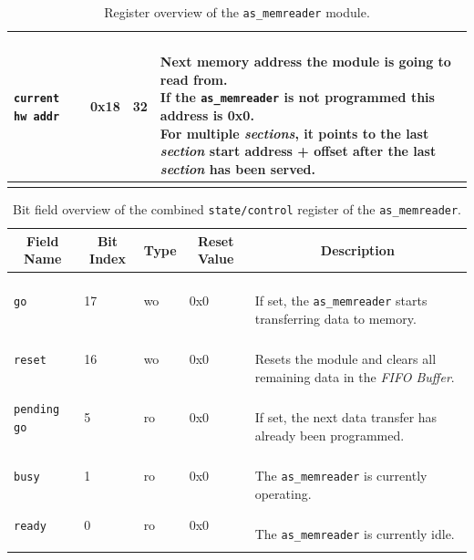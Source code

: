 \begin{longtable}[ht]{|l|l|l|l|}
    \texttt{current hw addr} & 0x18 & 32 & \parbox{7cm}{\ \\
        Next memory address the module is going to read from.\\
        If the \texttt{as\_memreader} is not programmed this address is 0x0.\\
        For multiple \textit{sections}, it points to the last \textit{section} start address + offset after the last \textit{section} has been served.\vspace{0.3em}
    }\\
    \hline
    \caption{Register overview of the \texttt{as\_memreader} module.}
\end{longtable}


\begin{longtable}[ht]{|l|l|l|l|l|}
    \hline
    \multicolumn{1}{|c|}{\textbf{Field Name}} & \multicolumn{1}{c|}{\textbf{Bit Index}} & \multicolumn{1}{c|}{\textbf{Type}} & \multicolumn{1}{c|}{\textbf{Reset Value}} & \multicolumn{1}{c|}{\textbf{Description}}\\
    \hline
    
    \texttt{go} & 17 & wo & 0x0 & \parbox{5cm}{\ \\
        If set, the \texttt{as\_memreader} starts transferring data to memory.\vspace{0.3em}
    }\\
    \hline
    
    \texttt{reset} & 16 & wo & 0x0 & \parbox{5cm}{\ \\
        Resets the module and clears all remaining data in the \textit{FIFO Buffer}.\vspace{0.3em}
    }\\
    \hline
    
    \texttt{pending go} & 5 & ro & 0x0 & \parbox{5cm}{\ \\
        If set, the next data transfer has already been programmed.\vspace{0.3em}
    }\\
    \hline
    
    \texttt{busy} & 1 & ro & 0x0 & \parbox{5cm}{\ \\
        The \texttt{as\_memreader} is currently operating.\vspace{0.3em}
    }\\
    \hline
    
    \texttt{ready} & 0 & ro & 0x0 & \parbox{5cm}{\ \\
        The \texttt{as\_memreader} is currently idle.\vspace{0.3em}
    }\\
    \hline
    \caption{Bit field overview of the combined \texttt{state/control} register of the \texttt{as\_memreader}.}
    \label{table:memreader-state-fields}
\end{longtable}


